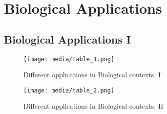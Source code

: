 \section{Biological Applications}
\label{sec:biological-applications}
\subsection{Biological Applications I}
\label{subsec:biological-applications-1}
\begin{frame}{\insertsubsection}
    \begin{figure}
        \centering
        \texttt{[image: media/table\_1.png]}
        \caption{Different applications in Biological contexts. I}
    \end{figure}
\end{frame}
%
%
\begin{frame}{\insertsubsection}
    \begin{figure}
        \centering
        \texttt{[image: media/table\_2.png]}
        \caption{Different applications in Biological contexts. II}
    \end{figure}
\end{frame}